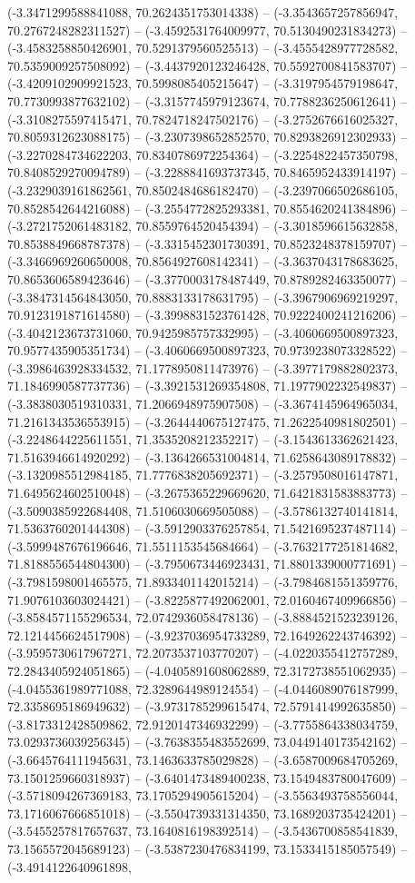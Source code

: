 (-3.3471299588841088, 70.2624351753014338) -- (-3.3543657257856947, 70.2767248282311527) -- (-3.4592531764009977, 70.5130490231834273) -- (-3.4583258850426901, 70.5291379560525513) -- (-3.4555428977728582, 70.5359009257508092) -- (-3.4437920123246428, 70.5592700841583707) -- (-3.4209102909921523, 70.5998085405215647) -- (-3.3197954579198647, 70.7730993877632102) -- (-3.3157745979123674, 70.7788236250612641) -- (-3.3108275597415471, 70.7824718247502176) -- (-3.2752676616025327, 70.8059312623088175) -- (-3.2307398652852570, 70.8293826912302933) -- (-3.2270284734622203, 70.8340786972254364) -- (-3.2254822457350798, 70.8408529270094789) -- (-3.2288841693737345, 70.8465952433914197) -- (-3.2329039161862561, 70.8502484686182470) -- (-3.2397066502686105, 70.8528542644216088) -- (-3.2554772825293381, 70.8554620241384896) -- (-3.2721752061483182, 70.8559764520454394) -- (-3.3018596615632858, 70.8538849668787378) -- (-3.3315452301730391, 70.8523248378159707) -- (-3.3466969260650008, 70.8564927608142341) -- (-3.3637043178683625, 70.8653606589423646) -- (-3.3770003178487449, 70.8789282463350077) -- (-3.3847314564843050, 70.8883133178631795) -- (-3.3967906969219297, 70.9123191871614580) -- (-3.3998831523761428, 70.9222400241216206) -- (-3.4042123673731060, 70.9425985757332995) -- (-3.4060669500897323, 70.9577435905351734) -- (-3.4060669500897323, 70.9739238073328522) -- (-3.3986463928334532, 71.1778950811473976) -- (-3.3977179882802373, 71.1846990587737736) -- (-3.3921531269354808, 71.1977902232549837) -- (-3.3838030519310331, 71.2066948975907508) -- (-3.3674145964965034, 71.2161343536553915) -- (-3.2644440675127475, 71.2622540981802501) -- (-3.2248644225611551, 71.3535208212352217) -- (-3.1543613362621423, 71.5163946614920292) -- (-3.1364266531004814, 71.6258643089178832) -- (-3.1320985512984185, 71.7776838205692371) -- (-3.2579508016147871, 71.6495624602510048) -- (-3.2675365229669620, 71.6421831583883773) -- (-3.5090385922684408, 71.5106030669505088) -- (-3.5786132740141814, 71.5363760201444308) -- (-3.5912903376257854, 71.5421695237487114) -- (-3.5999487676196646, 71.5511153545684664) -- (-3.7632177251814682, 71.8188556544804300) -- (-3.7950673446923431, 71.8801339000771691) -- (-3.7981598001465575, 71.8933401142015214) -- (-3.7984681551359776, 71.9076103603024421) -- (-3.8225877492062001, 72.0160467409966856) -- (-3.8584571155296534, 72.0742936058478136) -- (-3.8884521523239126, 72.1214456624517908) -- (-3.9237036954733289, 72.1649262243746392) -- (-3.9595730617967271, 72.2073537103770207) -- (-4.0220355412757289, 72.2843405924051865) -- (-4.0405891608062889, 72.3172738551062935) -- (-4.0455361989771088, 72.3289644989124554) -- (-4.0446089076187999, 72.3358695186949632) -- (-3.9731785299615474, 72.5791414992635850) -- (-3.8173312428509862, 72.9120147346932299) -- (-3.7755864338034759, 73.0293736039256345) -- (-3.7638355483552699, 73.0449140173542162) -- (-3.6645764111945631, 73.1463633785029828) -- (-3.6587009684705269, 73.1501259660318937) -- (-3.6401473489400238, 73.1549483780047609) -- (-3.5718094267369183, 73.1705294905615204) -- (-3.5563493758556044, 73.1716067666851018) -- (-3.5504739331314350, 73.1689203735424201) -- (-3.5455257817657637, 73.1640816198392514) -- (-3.5436700858541839, 73.1565572045689123) -- (-3.5387230476834199, 73.1533415185057549) -- (-3.4914122640961898, 